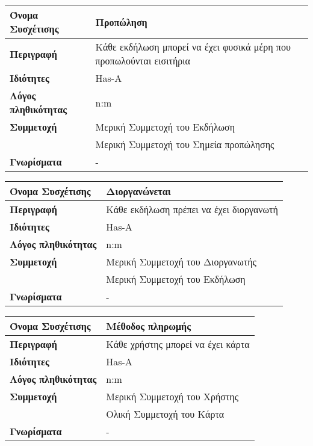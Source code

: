 \begin{center}
\begin{tabular}[]{|p{4cm}|p{10cm}|}
  \hline
  \textbf{Όνομα Συσχέτισης} & Προπώληση \\ \hline
  \textbf{Περιγραφή} & Κάθε εκδήλωση μπορεί να έχει φυσικά μέρη που προπωλούνται εισιτήρια\\ \hline
  \textbf{Ιδιότητες} & Has-A \\ \hline
  \textbf{Λόγος πληθικότητας} & n:m \\ \hline
  \textbf{Συμμετοχή} & Μερική Συμμετοχή του Εκδήλωση \\ \cline{2-2}
                     & Μερική Συμμετοχή του Σημεία προπώλησης\\ \hline
  \textbf{Γνωρίσματα} & - \\ \hline
\end{tabular}
\vspace{0.3 cm}


\begin{tabular}[]{|p{4cm}|p{10cm}|}
  \hline
  \textbf{Όνομα Συσχέτισης} & Διοργανώνεται\\  \hline
  \textbf{Περιγραφή} & Κάθε εκδήλωση πρέπει να έχει διοργανωτή\\ \hline
  \textbf{Ιδιότητες} & Has-A \\ \hline
  \textbf{Λόγος πληθικότητας} & n:m \\ \hline
  \textbf{Συμμετοχή} & Mερική Συμμετοχή του Διοργανωτής \\ \cline{2-2}
                     & Μερική Συμμετοχή του Εκδήλωση \\ \hline
  \textbf{Γνωρίσματα} & - \\ \hline
\end{tabular}
\vspace{0.3 cm}

\begin{tabular}[]{|p{4cm}|p{10cm}|}
  \hline
  \textbf{Όνομα Συσχέτισης} & Μέθοδος πληρωμής\\  \hline
  \textbf{Περιγραφή} & Κάθε χρήστης μπορεί να έχει κάρτα\\ \hline
  \textbf{Ιδιότητες} & Has-A \\ \hline
  \textbf{Λόγος πληθικότητας} & n:m \\ \hline
  \textbf{Συμμετοχή} & Mερική Συμμετοχή του Χρήστης \\ \cline{2-2}
                     & Ολική Συμμετοχή του Κάρτα \\ \hline
  \textbf{Γνωρίσματα} & - \\ \hline
\end{tabular}
\vspace{0.3 cm}



\end{center}
